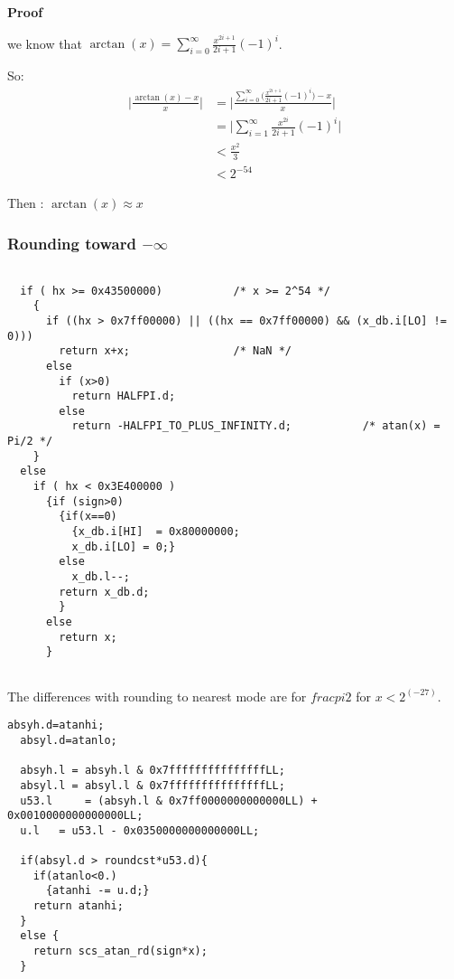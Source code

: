 \textbf{Proof}

 we know that $\arctan(x) = \displaystyle {\sum_{i=0}^{\infty}
\frac{x^{2i+1}}{2i+1}(-1)^i}$.

So:
\begin{equation}
   \begin{split}
       \Big| \frac{\arctan(x)-x}{x}  \Big| & = 
       \Bigg|\frac{ \displaystyle {\sum_{i=0}^{\infty}
       \Big( \frac{x^{2i+1}}{2i+1}(-1)^i} \Big) - x}{x} \Bigg|
       \nonumber\\
       & = \Big|\displaystyle {\sum_{i=1}^{\infty}}
       \frac{x^{2i}}{2i+1}(-1)^i\Big|\nonumber \\ 
       & < \frac{x^2}{3}\nonumber \\
       & < 2^{-54} \nonumber
   \end{split}
\end{equation}

Then : $\arctan(x) \approx x $
\bigskip

\subsubsection{Rounding toward $-\infty$}
\begin{lstlisting}[caption={Exceptional cases : rounding down},firstnumber=1]

  if ( hx >= 0x43500000)           /* x >= 2^54 */
    {
      if ((hx > 0x7ff00000) || ((hx == 0x7ff00000) && (x_db.i[LO] != 0)))
        return x+x;                /* NaN */
      else
        if (x>0)
          return HALFPI.d;
        else
          return -HALFPI_TO_PLUS_INFINITY.d;           /* atan(x) = Pi/2 */
    }
  else
    if ( hx < 0x3E400000 )
      {if (sign>0)
        {if(x==0)
          {x_db.i[HI]  = 0x80000000;
          x_db.i[LO] = 0;}
        else
          x_db.l--;
        return x_db.d;
        }
      else
        return x;
      }
  
\end{lstlisting}

The differences with rounding to nearest mode are for $frac{pi}{2}$ for
$x<2^(-27)$.

\begin{lstlisting}[caption={Test for rounding down},firstnumber=1]
  absyh.d=atanhi;
  absyl.d=atanlo;
  
  absyh.l = absyh.l & 0x7fffffffffffffffLL;
  absyl.l = absyl.l & 0x7fffffffffffffffLL;
  u53.l     = (absyh.l & 0x7ff0000000000000LL) +  0x0010000000000000LL;
  u.l   = u53.l - 0x0350000000000000LL;
  
  if(absyl.d > roundcst*u53.d){
    if(atanlo<0.)
      {atanhi -= u.d;}
    return atanhi;
  }
  else {
    return scs_atan_rd(sign*x);
  }
\end{lstlisting}

